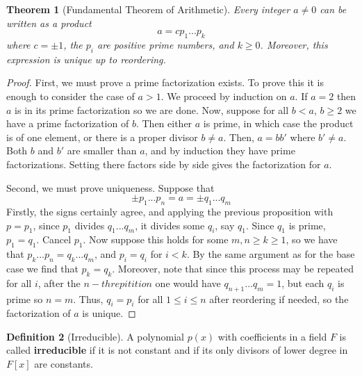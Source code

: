 \documentclass[12pt]{article}
\newtheorem{thm}{Theorem}[section]
\theoremstyle{definition}
\newtheorem{defn}[thm]{Definition}
\theoremstyle{remark}
\numberwithin{equation}{section}
\newcommand\B[1]{\textbf{ #1}}
\begin{document}
\begin{thm}[Fundamental Theorem of Arithmetic]
        Every integer $a \neq 0$ can be written as a product \begin{equation}
                a = cp_1...p_k
        \end{equation}
        where $c = \pm 1$, the $p_i$ are positive prime numbers, and $k \geq 0$. Moreover, this expression is unique up to reordering.
\end{thm}
\begin{proof}
        First, we must prove a prime factorization exists. To prove this it is enough to consider the case of $a > 1$. We proceed by induction on $a$. If $a = 2$ then $a$ is in its prime factorization so we are done. Now, suppose for all $b < a$, $b \geq 2$ we have a prime factorization of $b$. Then either $a$ is prime, in which case the product is of one element, or there is a proper divisor $b \neq a$. Then, $a = bb'$ where $b' \neq a$. Both $b$ and $b'$ are smaller than $a$, and by induction they have prime factorizations. Setting there factors side by side gives the factorization for $a$. 

        Second, we must prove uniqueness. Suppose that \begin{equation}
                \pm p_1...p_n = a = \pm q_1 ... q_m
        \end{equation}
        Firstly, the signs certainly agree, and applying the previous proposition with $p = p_1$, since $p_1$ divides $q_1...q_m$, it divides some $q_i$, say $q_1$. Since $q_1$ is prime, $p_1 = q_1$. Cancel $p_1$. Now suppose this holds for some $m,n \geq k \geq 1$, so we have that $p_k...p_n = q_k...q_m$, and $p_i = q_i$ for $i < k$. By the same argument as for the base case we find that $p_k = q_k$. Moreover, note that since this process may be repeated for all $i$, after the $n-th repitition$ one would have $q_{n+1}...q_m = 1$, but each $q_i$ is prime so $n = m$. Thus, $q_i = p_i$ for all $1 \leq i \leq n$ after reordering if needed, so the factorization of $a$ is unique.
\end{proof}

\vspace{15pt}

\begin{defn}[Irreducible]
        A polynomial $p(x)$ with coefficients in a field $F$ is called \B{irreducible} if it is not constant and if its only divisors of lower degree in $F[x]$ are constants. 
\end{defn}
\end{document}

